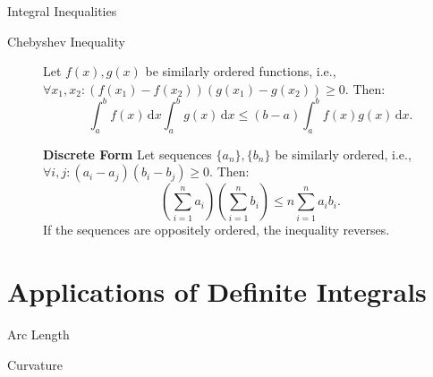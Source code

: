 \documentclass[11pt]{../../TexTemplate/elegantbook}
\begin{document}
\begin{theorem}{Integral Inequalities}
\begin{description}
        \item[Chebyshev Inequality] Let \( f(x), g(x) \) be similarly ordered functions, 
                i.e., \( \forall x_1, x_2: (f(x_1) - f(x_2))(g(x_1) - g(x_2)) \geqslant 0 \). Then:
                \[
                \int_{a}^{b} f(x) \, \mathrm{d}x \int_{a}^{b} g(x) \, \mathrm{d}x \leqslant (b - a) \int_{a}^{b} f(x)g(x) \, \mathrm{d}x.
                \]

            \textbf{Discrete Form} Let sequences \( \{a_n\}, \{b_n\} \) be similarly ordered, 
                i.e., \( \forall i, j: (a_i - a_j)(b_i - b_j) \geqslant 0 \). Then:
                \[
                \left( \sum\limits_{i=1}^{n} a_i \right) \left( \sum\limits_{i=1}^{n} b_i \right) \leqslant n \sum\limits_{i=1}^{n} a_i b_i.
                \]
            If the sequences are oppositely ordered, the inequality reverses.
    \end{description}
\end{theorem}

\section{Applications of Definite Integrals}
\begin{leftbarTitle}{Arc Length}\end{leftbarTitle}

\begin{leftbarTitle}{Curvature}\end{leftbarTitle}
\end{document}
